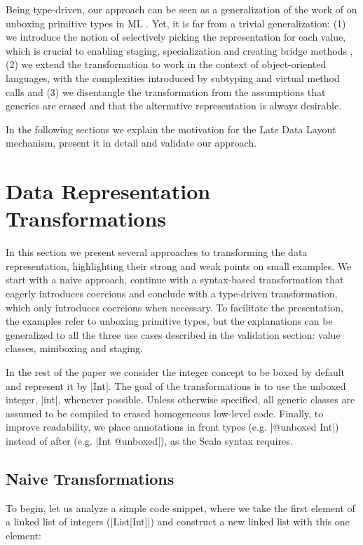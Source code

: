 Being type-driven, our approach can be seen as a generalization of the work of  on unboxing primitive types in ML \cite{leroy-unboxed-objects}. Yet, it is far from a trivial generalization: (1) we introduce the notion of selectively picking the representation for each value, which is crucial to enabling staging, specialization and creating bridge methods \cite{cartwright-nextgen}, (2) we extend the transformation to work in the context of object-oriented languages, with the complexities introduced by subtyping and virtual method calls and (3) we disentangle the transformation from the assumptions that generics are erased and that the alternative representation is always desirable.

In the following sections we explain the motivation for the Late Data Layout mechanism, present it in detail and validate our approach.

\section{Data Representation Transformations}
\label{sec:problem}

In this section we present several approaches to transforming the data representation, highlighting their strong and weak points on small examples. We start with a naive approach, continue with a syntax-based transformation that eagerly introduces coercions and conclude with a type-driven transformation, which only introduces coercions when necessary. To facilitate the presentation, the examples refer to unboxing primitive types, but the explanations can be generalized to all the three use cases described in the validation section: value classes, miniboxing and staging.

In the rest of the paper we consider the integer concept to be boxed by default and represent it by |Int|. The goal of the transformations is to use the unboxed integer, |int|, whenever possible. Unless otherwise specified, all generic classes are assumed to be compiled to erased homogeneous low-level code. Finally, to improve readability, we place annotations in front types (e.g. |@unboxed Int|) instead of after (e.g. |Int @unboxed|), as the Scala syntax requires.

\subsection{Naive Transformations}

To begin, let us analyze a simple code snippet, where we take the first element of a linked list of integers (|List[Int]|) and construct a new linked list with this one element:

